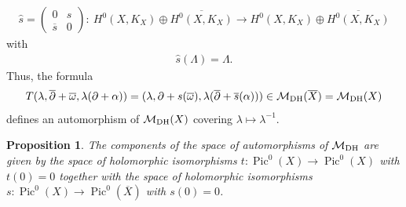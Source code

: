 \documentclass[pdftex]{sigma}
\numberwithin{equation}{section}
\newtheorem{Proposition}[Theorem]{Proposition}
 { \theoremstyle{definition}
\newtheorem{Definition}[Theorem]{Definition}
\newtheorem{Remark}[Theorem]{Remark} }
\begin{document}
\begin{gather*}\widehat{s}=\left( \begin{matrix}
 0 & s \\  \overline{s} & 0   \end{matrix}  \right) \colon \ H^0(X, K_X)\oplus\overline{H^0(X, K_X)}
 \longrightarrow H^0(X, K_X)\oplus\overline{H^0(X, K_X)}\end{gather*}
with
\begin{gather*}\widehat{s}(\Lambda) = \Lambda .\end{gather*}
Thus, the formula
\begin{gather}\label{barTeq2}
T(\lambda, \overline{\partial}+\overline{\omega}, \lambda(\partial+\alpha)) = (\lambda, \partial+s(\overline{\omega}), \lambda(\overline{\partial}+
\overline{s}(\alpha))) \in {\mathcal M}_{\rm DH}(\overline{X})  = {\mathcal M}_{\rm DH}( X)
\end{gather}
def\/ines an automorphism of ${\mathcal M}_{\rm DH}( X)$ covering $\lambda \longmapsto \lambda^{-1}$.

\begin{Proposition}\label{prop3}
The components of the space of automorphisms of ${\mathcal M}_{\rm DH}$ are given by the space of holomorphic isomorphisms $t \colon \operatorname{Pic}^0(X) \longrightarrow \operatorname{Pic}^0(X)$ with $t(0) = 0$ together with the space of holomorphic isomorphisms $s \colon \operatorname{Pic}^0(X) \longrightarrow \operatorname{Pic}^0(\overline{X})$ with $s(0) = 0$.
\end{Proposition}
\end{document}
